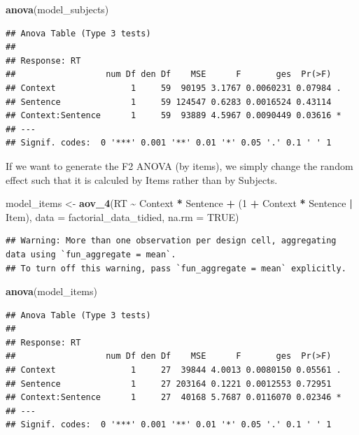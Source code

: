 \documentclass[
]{book}
\newenvironment{Shaded}{\begin{snugshade}}{\end{snugshade}}
\newcommand{\AttributeTok}[1]{\textcolor[rgb]{0.13,0.29,0.53}{#1}}
\newcommand{\ConstantTok}[1]{\textcolor[rgb]{0.56,0.35,0.01}{#1}}
\newcommand{\DecValTok}[1]{\textcolor[rgb]{0.00,0.00,0.81}{#1}}
\newcommand{\FunctionTok}[1]{\textcolor[rgb]{0.13,0.29,0.53}{\textbf{#1}}}
\newcommand{\NormalTok}[1]{#1}
\newcommand{\OtherTok}[1]{\textcolor[rgb]{0.56,0.35,0.01}{#1}}
\newcommand{\SpecialCharTok}[1]{\textcolor[rgb]{0.81,0.36,0.00}{\textbf{#1}}}
\begin{document}
\begin{Shaded}
\begin{Highlighting}[]
\FunctionTok{anova}\NormalTok{(model\_subjects)}
\end{Highlighting}
\end{Shaded}

\begin{verbatim}
## Anova Table (Type 3 tests)
## 
## Response: RT
##                  num Df den Df    MSE      F       ges  Pr(>F)  
## Context               1     59  90195 3.1767 0.0060231 0.07984 .
## Sentence              1     59 124547 0.6283 0.0016524 0.43114  
## Context:Sentence      1     59  93889 4.5967 0.0090449 0.03616 *
## ---
## Signif. codes:  0 '***' 0.001 '**' 0.01 '*' 0.05 '.' 0.1 ' ' 1
\end{verbatim}

If we want to generate the F2 ANOVA (by items), we simply change the random effect such that it is calculed by Items rather than by Subjects.

\begin{Shaded}
\begin{Highlighting}[]
\NormalTok{model\_items }\OtherTok{\textless{}{-}} \FunctionTok{aov\_4}\NormalTok{(RT }\SpecialCharTok{\textasciitilde{}}\NormalTok{ Context }\SpecialCharTok{*}\NormalTok{ Sentence }\SpecialCharTok{+}\NormalTok{ (}\DecValTok{1} \SpecialCharTok{+}\NormalTok{ Context }\SpecialCharTok{*}\NormalTok{ Sentence }\SpecialCharTok{|}\NormalTok{ Item), }\AttributeTok{data =}\NormalTok{ factorial\_data\_tidied, }\AttributeTok{na.rm =} \ConstantTok{TRUE}\NormalTok{)}
\end{Highlighting}
\end{Shaded}

\begin{verbatim}
## Warning: More than one observation per design cell, aggregating data using `fun_aggregate = mean`.
## To turn off this warning, pass `fun_aggregate = mean` explicitly.
\end{verbatim}

\begin{Shaded}
\begin{Highlighting}[]
\FunctionTok{anova}\NormalTok{(model\_items)}
\end{Highlighting}
\end{Shaded}

\begin{verbatim}
## Anova Table (Type 3 tests)
## 
## Response: RT
##                  num Df den Df    MSE      F       ges  Pr(>F)  
## Context               1     27  39844 4.0013 0.0080150 0.05561 .
## Sentence              1     27 203164 0.1221 0.0012553 0.72951  
## Context:Sentence      1     27  40168 5.7687 0.0116070 0.02346 *
## ---
## Signif. codes:  0 '***' 0.001 '**' 0.01 '*' 0.05 '.' 0.1 ' ' 1
\end{verbatim}
\end{document}
